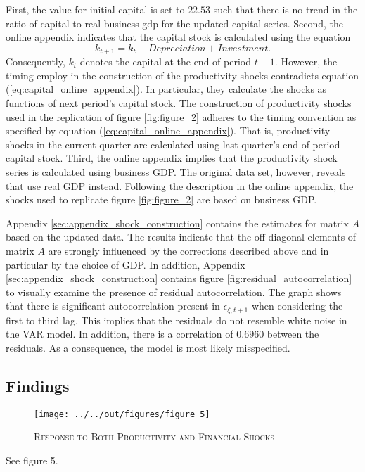 First, the value for initial capital is set to $22.53$ such that there is no trend in the ratio of capital to real business gdp for the updated capital series. Second, the online appendix indicates that the capital stock is calculated using the equation
\begin{equation} 
\label{eq:capital_online_appendix}
k_{t+1} = k_{t} - Depreciation + Investment.
\end{equation} 
Consequently, ${k}_t$ denotes the capital at the end of period $t-1$. However, the timing \citeauthor{JERMANNfinancial} employ in the construction of the productivity shocks contradicts equation (\ref{eq:capital_online_appendix}). In particular, they  calculate the shocks as functions of next period's capital stock. The construction of productivity shocks used in the replication of figure \ref{fig:figure_2} adheres to the timing convention as specified by equation (\ref{eq:capital_online_appendix}). That is, productivity shocks in the current quarter are calculated using last quarter's end of period capital stock. Third, the online appendix implies that the productivity shock series is calculated using business GDP. The original data set, however, reveals that \citeauthor{JERMANNfinancial} use real GDP instead. Following the description in the online appendix, the shocks used to replicate figure \ref{fig:figure_2} are based on business GDP. 

Appendix \ref{sec:appendix_shock_construction} contains the estimates for matrix $A$ based on the updated data. The results indicate that the off-diagonal elements of matrix $A$ are strongly influenced by the corrections described above and in particular by the choice of GDP. In addition, Appendix \ref{sec:appendix_shock_construction} contains figure \ref{fig:residual_autocorrelation} to visually examine the presence of residual autocorrelation. The graph shows that there is significant autocorrelation present in ${\epsilon}_{\xi,t+1}$ when considering the first to third lag. This implies that the residuals do not resemble white noise in the VAR model. In addition, there is a correlation of $0.6960$ between the residuals. As a consequence, the model is most likely misspecified.


\subsection{Findings}
\label{sec:findings}

\begin{figure}[t]
	\begin{center}
	    \texttt{[image: ../../out/figures/figure\_5]}
	    \caption{\textsc{Response to Both Productivity and Financial Shocks}}
	    \label{fig:figure_5}
    \end{center}
\end{figure}

See figure 5.